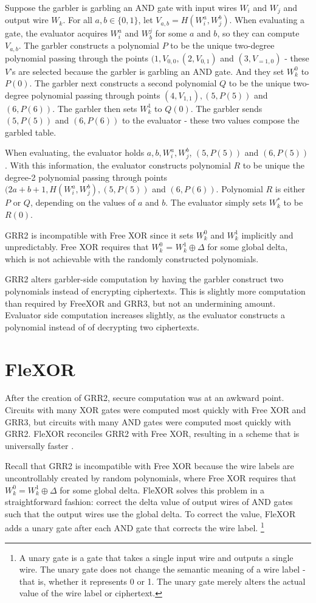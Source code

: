 Suppose the garbler is garbling an AND gate with input wires $W_i$ and $W_j$ and output wire $W_k$.
For all $a,b \in \{0,1\}$, let $V_{a,b} = H(W_i^a, W_j^b)$.
When evaluating a gate, the evaluator acquires $W_i^a$ and $W_b^j$ for some $a$ and $b$, so they can compute $V_{a,b}$.
The garbler constructs a polynomial $P$ to be the unique two-degree polynomial passing through the points $(1, V_{0,0}, (2, V_{0,1})$ and $(3, V_{=1,0})$ - these $V$'s are selected because the garbler is garbling an AND gate.
And they set $W_k^0$ to $P(0)$.
The garbler next constructs a second polynomial $Q$ to be the unique two-degree polynomial passing through points $(4, V_{1,1}), (5, P(5))$ and  $(6, P(6))$.
The garbler then sets $W_k^1$ to $Q(0)$.
The garbler sends $(5, P(5))$ and $(6, P(6))$ to the evaluator - these two values compose the garbled table.

When evaluating, the evaluator holds $a, b, W_i^a, W_j^b$, $(5, P(5))$ and $(6, P(5))$.
With this information, the evaluator constructs polynomial $R$ to be unique the degree-2 polynomial passing through points $(2a + b + 1, H(W_i^a, W_j^b), (5, P(5))$ and $(6, P(6))$.
Polynomial $R$ is either $P$ or $Q$, depending on the values of $a$ and $b$.
The evaluator simply sets $W_k^*$ to be $R(0)$.

GRR2 is incompatible with Free XOR since it sets $W_k^0$ and $W_k^1$ implicitly and unpredictably.
Free XOR requires that $W_k^0$ = $W_k^1 \oplus \Delta$ for some global delta, which is not achievable with the randomly constructed polynomials.

GRR2 alters garbler-side computation by having the garbler construct two polynomials instead of encrypting ciphertexts.
This is slightly more computation than required by FreeXOR and GRR3, but not an undermining amount.
Evaluator side computation increases slightly, as the evaluator constructs a polynomial instead of of decrypting two ciphertexts.


\section{FleXOR}
After the creation of GRR2, secure computation was at an awkward point.
Circuits with many XOR gates were computed most quickly with Free XOR and GRR3, but circuits with many AND gates were computed most quickly with GRR2.
FleXOR reconciles GRR2 with Free XOR, resulting in a scheme that is universally faster \cite{flexor}.

Recall that GRR2 is incompatible with Free XOR because the wire labels are uncontrollably created by random polynomials, where Free XOR requires that $W_k^0 = W_k^1 \oplus \Delta$ for some global delta.
FleXOR solves this problem in a straightforward fashion: correct the delta value of output wires of AND gates such that the output wires use the global delta.
To correct the value, FleXOR adds a unary gate after each AND gate that corrects the wire label. \footnote{A unary gate is a gate that takes a single input wire and outputs a single wire. The unary gate does not change the semantic meaning of a wire label - that is, whether it represents 0 or 1. The unary gate merely alters the actual value of the wire label or ciphertext.}

